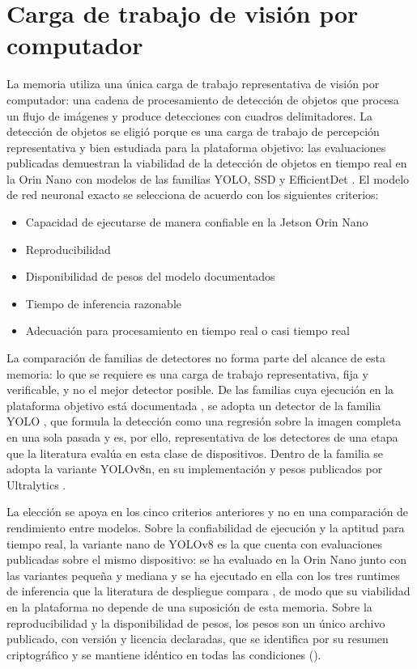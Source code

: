 \section{Carga de trabajo de visión por computador}
\label{sec:workload}

La memoria utiliza una única carga de trabajo representativa de visión por
computador: una cadena de procesamiento de detección de objetos que procesa
un flujo de imágenes y produce detecciones con cuadros delimitadores. La
detección de objetos se eligió porque es una carga de trabajo de percepción
representativa y bien estudiada para la plataforma objetivo: las
evaluaciones publicadas demuestran la viabilidad de la detección de objetos
en tiempo real en la Orin Nano con modelos de las familias YOLO, SSD y
EfficientDet \cite{scalcon2024, alqahtani2026, szegedi2026, tang2026}. El
modelo de red neuronal exacto se selecciona de acuerdo con los siguientes
criterios:

\begin{itemize}
  \item Capacidad de ejecutarse de manera confiable en la Jetson Orin Nano
  \item Reproducibilidad
  \item Disponibilidad de pesos del modelo documentados
  \item Tiempo de inferencia razonable
  \item Adecuación para procesamiento en tiempo real o casi tiempo real
\end{itemize}

La comparación de familias de detectores no forma parte del alcance de esta
memoria: lo que se requiere es una carga de trabajo representativa, fija y
verificable, y no el mejor detector posible. De las familias cuya ejecución
en la plataforma objetivo está documentada \cite{scalcon2024,
alqahtani2026, szegedi2026, tang2026}, se adopta un detector de la familia
YOLO \cite{redmon2016}, que formula la detección como una regresión sobre la
imagen completa en una sola pasada y es, por ello, representativa de los
detectores de una etapa que la literatura evalúa en esta clase de
dispositivos. Dentro de la familia se adopta la variante YOLOv8n, en su
implementación y pesos publicados por Ultralytics \cite{ultralytics2023}.

La elección se apoya en los cinco criterios anteriores y no en una
comparación de rendimiento entre modelos. Sobre la confiabilidad de
ejecución y la aptitud para tiempo real, la variante nano de YOLOv8 es la
que cuenta con evaluaciones publicadas sobre el mismo dispositivo: se ha
evaluado en la Orin Nano junto con las variantes pequeña y mediana
\cite{alqahtani2026} y se ha ejecutado en ella con los tres runtimes de
inferencia que la literatura de despliegue compara \cite{szegedi2026}, de
modo que su viabilidad en la plataforma no depende de una suposición de esta
memoria. Sobre la reproducibilidad y la disponibilidad de pesos, los pesos
son un único archivo publicado, con versión y licencia declaradas, que se
identifica por su resumen criptográfico y se mantiene idéntico en todas las
condiciones ().

